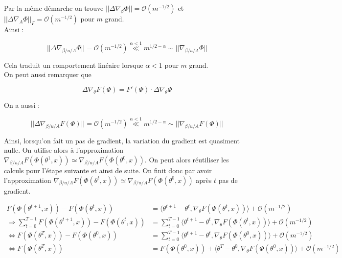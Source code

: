 \documentclass[a4paper, 11pt, french]{article}
\theoremstyle{definition}
\begin{document}
\begin{itemize}
	Par la même démarche on trouve $||\Delta \nabla_{\beta} \Phi|| = \mathcal{O}(m^{-1/2})$ et $||\Delta \nabla_{A} \Phi||_F = \mathcal{O}(m^{-1/2})$ pour $m$ grand. \\
	
	Ainsi :
	
	\[||\Delta \nabla_{\beta / u / A} \Phi|| = \mathcal{O}(m^{-1/2}) \stackrel{\alpha < 1}{\ll} m^{1/2 - \alpha} \sim ||\nabla_{\beta / u / A} \Phi||\]
	
	Cela traduit un comportement linéaire lorsque $\alpha < 1$ pour $m$ grand. \\
	
	On peut aussi remarquer que
	
	\[\Delta \nabla_{\theta} F(\Phi) =  F'(\Phi) \cdot \Delta \nabla_{\theta} \Phi \]
	
	On a aussi :

	\[||\Delta \nabla_{\beta / u / A} F(\Phi) || = \mathcal{O}(m^{-1/2}) \stackrel{\alpha < 1}{\ll} m^{1/2 - \alpha} \sim ||\nabla_{\beta / u / A} F(\Phi)||\]

	Ainsi, lorsqu'on fait un pas de gradient, la variation du gradient est quasiment nulle. On utilise alors à l'approximation $\nabla_{\beta / u / A} F(\Phi(\theta^1,x)) \simeq \nabla_{\beta / u / A} F(\Phi(\theta^0,x))$. On peut alors réutiliser les calculs pour l'étape suivante et ainsi de suite. On finit donc par avoir l'approximation $\nabla_{\beta / u / A} F(\Phi(\theta^t,x)) \simeq \nabla_{\beta / u / A} F(\Phi(\theta^0,x))$ après $t$ pas de gradient.
	
	\begin{align*}
		F(\Phi(\theta^{t+1}, x)) - F(\Phi(\theta^t, x))&= \langle \theta^{t+1}-\theta^t , \nabla_{\theta} F(\Phi(\theta^t, x))  \rangle  + \mathcal{O}(m^{-1/2}) \\
		\Longrightarrow \sum_{t=0}^{T-1} F(\Phi(\theta^{t+1}, x)) - F(\Phi(\theta^t, x)) &= \sum_{t=0}^{T-1} \langle \theta^{t+1}-\theta^t , \nabla_{\theta} F(\Phi(\theta^t, x))  \rangle  + \mathcal{O}(m^{-1/2}) \\
		\Longleftrightarrow F(\Phi(\theta^{T}, x)) - F(\Phi(\theta^{0}, x)) &= \sum_{t=0}^{T-1} \langle \theta^{t+1}-\theta^t , \nabla_{\theta} F(\Phi(\theta^0, x))  \rangle  + \mathcal{O}(m^{-1/2}) \\
		\Longleftrightarrow	F(\Phi(\theta^{T}, x)) &= F(\Phi(\theta^{0}, x)) + \langle \theta^{T}-\theta^0 , \nabla_{\theta} F(\Phi(\theta^0, x))  \rangle  + \mathcal{O}(m^{-1/2})
	\end{align*}


\end{itemize}
\end{document}

